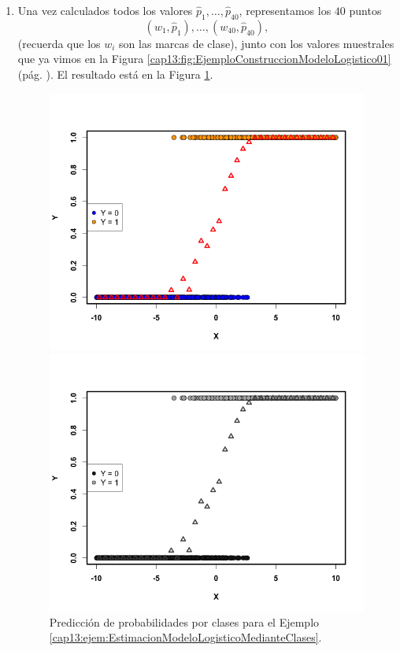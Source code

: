 \begin{ejemplo}
\begin{enumerate}
  \item Una vez calculados todos los valores $\hat p_1,\ldots, \hat p_{40}$, representamos los $40$ puntos
      \[(w_1,\hat p_1), \ldots, (w_{40},\hat p_{40}),\]
      (recuerda que los $w_i$ son las marcas de clase), junto con los valores muestrales que ya vimos en la Figura \ref{cap13:fig:EjemploConstruccionModeloLogistico01} (pág. \pageref{cap13:fig:EjemploConstruccionModeloLogistico01}). El resultado está en la Figura \ref{cap13:fig:EjemploConstruccionModeloLogistico02}.
\begin{figure}[h!]
\begin{center}
\begin{enColor}
\includegraphics[width=13cm]{../fig/Cap13-EjemploConstruccionModeloLogistico02.png}
\end{enColor}
\begin{bn}
    \includegraphics[width=13cm]{../fig/Cap13-EjemploConstruccionModeloLogistico02-bn.png}
\end{bn}
\caption{Predicción de probabilidades por clases para el Ejemplo \ref{cap13:ejem:EstimacionModeloLogisticoMedianteClases}. }
\label{cap13:fig:EjemploConstruccionModeloLogistico02}
\end{center}
\end{figure}


\end{enumerate}
\end{ejemplo}
